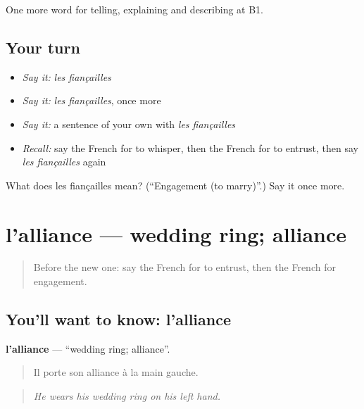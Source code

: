 \begin{grammarlens}[title={What you've built}]
One more word for telling, explaining and describing at B1.
\end{grammarlens}

\subsection*{Your turn}
\begin{itemize}
\raggedright
  \item \emph{Say it:} \emph{les fiançailles}
  \item \emph{Say it:} \emph{les fiançailles}, once more
  \item \emph{Say it:} a sentence of your own with \emph{les fiançailles}
  \item \emph{Recall:} say the French for to whisper, then the French for to entrust, then say \emph{les fiançailles} again
\end{itemize}

\begin{tcolorbox}[breakable,colback=teal!4,colframe=teal!35!black,title={Before you move on}]
What does les fiançailles mean? (\textquotedblleft{}Engagement (to marry)\textquotedblright{}.) Say it once more.
\end{tcolorbox}
\section[l'alliance]{l'alliance — wedding ring; alliance}

\label{lesson:FR-C489-alliance}



\begin{quote}
Before the new one: say the French for to entrust, then the French for engagement.
\end{quote}

\subsection*{You'll want to know: l'alliance}
\textbf{l'alliance} — \textquotedblleft{}wedding ring; alliance\textquotedblright{}.

\begin{quote}
Il porte son alliance à la main gauche.
\end{quote}

\begin{quote}
\emph{He wears his wedding ring on his left hand.}
\end{quote}

